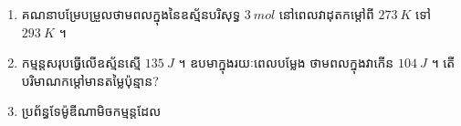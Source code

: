 \documentclass[12pt, a4paper]{article}
\begin{document}
\maketitle\koc
	\begin{enumerate}[m]
		\item គណនាបម្រែបម្រួលថាមពលក្នុងនៃឧស្ម័នបរិសុទ្ធ $3~mol$ នៅពេលវាដុតកម្តៅពី $273~K$ ទៅ $293~K$ ។
		\item កម្មន្តសរុបធ្វើលើឧស្ម័នស្មើ $135~J$ ។ ឧបមាក្នុងរយៈពេលបម្លែង ថាមពលក្នុងវាកើន $104~J$ ។ តើបរិមាណកម្តៅមានតម្លៃប៉ុន្មាន?
		\item ប្រព័ន្ធទែម៉ូឌីណាមិចកម្មន្តដែល
	\end{enumerate}
\end{document}
